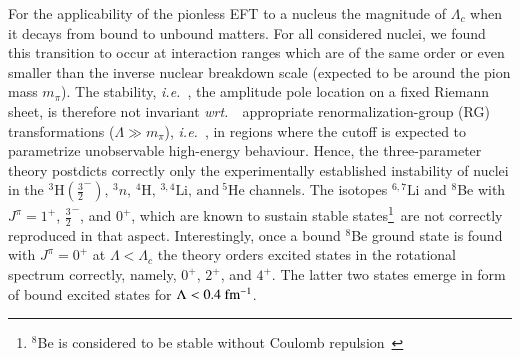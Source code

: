 \documentclass[preprint,12pt]{elsarticle}
\newcommand{\lc}{\ensuremath{\Lambda_c}}
\newcommand{\wrt}{\textit{wrt.}~}
\newcommand{\ie}{\textit{i.e.}~}
\begin{document}
%
For the applicability of the pionless EFT to a nucleus the magnitude of $\lc$ when it decays from
bound to unbound matters. For all considered nuclei, we found this transition to occur at interaction ranges which are of the
same order or even smaller than the inverse nuclear breakdown scale (expected to be around the pion mass $m_\pi$).
The stability, \ie, the amplitude pole location on a fixed Riemann sheet, is therefore not invariant \wrt~appropriate renormalization-group (RG)
transformations ($\Lambda\gg m_\pi$), \ie, in regions where the cutoff is expected to parametrize unobservable high-energy behaviour.
Hence, the three-parameter theory postdicts correctly only the experimentally established instability of nuclei in the
$^3\text{H}(\frac{3}{2}^-),\,^3n,\,^4\text{H},\,^{3,4}\text{Li},\,\text{and}~^5\text{He}$ channels.
The isotopes $^{6,7}\text{Li}$ and $^8$Be with $J^\pi=1^+$, $\frac{3}{2}^-$, and $0^+$, which are known to sustain stable
states\footnote{$^8$Be is considered to be stable without Coulomb repulsion~\cite{AFZAL:1969zz,Higa:2008dn}}~are
not correctly reproduced in that aspect.
%
Interestingly, once a bound $^8$Be ground state is found with $J^\pi=0^+$ at $\Lambda<\lc$ the theory orders excited states in the
rotational spectrum correctly, namely, $0^+$, $2^+$, and $4^+$. 
The latter two states emerge in form of bound excited states for $\Lambda<0.4~{\rm fm^{-1}}$.
\end{document}

